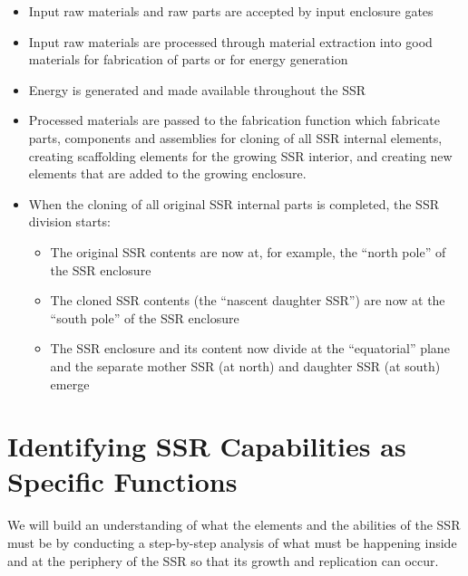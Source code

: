 \begin{itemize}
\item Input raw materials and raw parts are accepted by input enclosure
gates
\item Input raw materials are processed through material extraction into
good materials for fabrication of parts or for energy generation
\item Energy is generated and made available throughout the SSR
\item Processed materials are passed to the fabrication function which fabricate parts, components and
assemblies for cloning of all SSR internal elements, creating scaffolding elements for the growing SSR interior, and creating new elements that are added to the growing enclosure.
\item When the cloning of all original SSR internal parts is completed,
the SSR division starts:

\begin{itemize}
\item The original SSR contents are now at, for example, the “north pole”
of the SSR enclosure
\item The cloned SSR contents (the “nascent daughter SSR”) are now at the
“south pole” of the SSR enclosure
\item The SSR enclosure and its content now divide at the “equatorial”
plane and the separate mother SSR (at north) and daughter SSR (at south)
emerge
\end{itemize}
\end{itemize}

\section[Identifying SSR Capabilities]{Identifying SSR Capabilities as Specific Functions}

We will build an
understanding of what the elements and the abilities of the
SSR must be by conducting a step-by-step analysis of what must be happening inside and at
the periphery of the SSR so that its growth and replication can occur.

